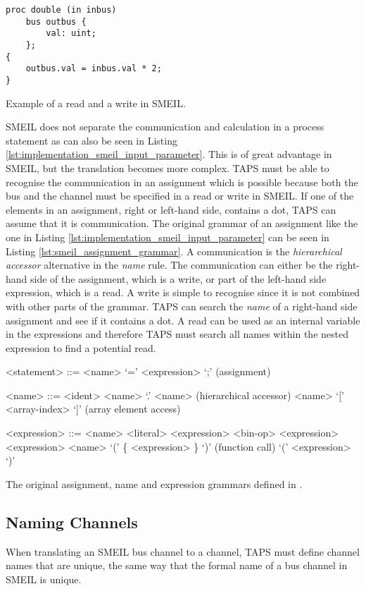 \begin{listing}
\begin{verbatim}
proc double (in inbus)
    bus outbus {
        val: uint;
    };
{
    outbus.val = inbus.val * 2;
}
\end{verbatim}
\caption{Example of a read and a write in SMEIL.}
\label{lst:implementation_smeil_input_parameter}
\end{listing}
SMEIL does not separate the communication and calculation in a process statement as can also be seen in Listing \ref{lst:implementation_smeil_input_parameter}. This is of great advantage in SMEIL, but the translation becomes more complex.
TAPS must be able to recognise the communication in an assignment which is possible because both the bus and the channel must be specified in a read or write in SMEIL. If one of the elements in an assignment, right or left-hand side, contains a dot, TAPS can assume that it is communication. The original grammar of an assignment like the one in Listing \ref{lst:implementation_smeil_input_parameter} can be seen in Listing \ref{lst:smeil_assignment_grammar}. A communication is the \textit{hierarchical accessor} alternative in the \textit{name} rule. The communication can either be the right-hand side of the assignment, which is a write, or part of the left-hand side expression, which is a read. A write is simple to recognise since it is not combined with other parts of the grammar. TAPS can search the \textit{name} of a right-hand side assignment and see if it contains a dot.
A read can be used as an internal variable in the expressions and therefore TAPS must search all names within the nested expression to find a potential read.
\begin{listing}
\begin{grammar}
<statement> ::= <name> `=' <expression> `;' (assignment)

<name> ::= <ident>
\alt <name> `.' <name> (hierarchical accessor)
\alt <name> `[' <array-index> `]' (array element access)

<expression> ::= <name>
\alt <literal>
\alt <expression> <bin-op> <expression>
 <expression>
\alt <name> `(' \{ <expression> \}  `)' (function call)
\alt `(' <expression> `)'


\end{grammar}
\caption{The original assignment, name and expression grammars defined in \cite{Asheim2018}.}
\label{lst:smeil_assignment_grammar}
\end{listing}
\subsection{Naming Channels}
When translating an SMEIL bus channel to a \cspm{} channel, TAPS must define \cspm{} channel names that are unique, the same way that the formal name of a bus channel in SMEIL is unique.\\

